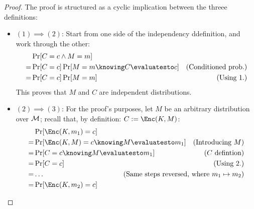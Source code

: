 \begin{proof}
    The proof is structured as a cyclic implication between the threee definitions:
    
    \begin{itemize}
        \item $(1) \implies (2)$: Start from one side of the independency ddefinition, and work through the other:
        \begin{align*}
            & \Pr[C = c \wedge M = m]                           & \\
            =& \Pr[C = c] \Pr[M = m \knowing C \evaluatesto c]  & \text{(Conditioned prob.)} \\
            =& \Pr[C = c] \Pr[M = m]                            & \text{(Using 1.)} \\
        \end{align*}
        This proves that $M$ and $C$ are independent distributions.
        
        \item $(2) \implies (3)$: For the proof's purposes, let $M$ be an arbitrary distribution over $\mathcal{M}$; recall that, by definition: $C := \Enc(K, M)$:
        \begin{align*}
            & \Pr[\Enc(K, m_1) = c]                             & \\
            =& \Pr[\Enc(K, M) = c \knowing M \evaluatesto m_1]  & \text{(Introducing $M$)} \\
            =& \Pr[C = c \knowing M \evaluatesto m_1]           & \text{($C$ defintion)} \\
            =& \Pr[C = c]                                       & \text{(Using 2.)} \\
            =& \dots                                            & \mathllap{\text{(Same steps reversed, where $m_1 \mapsto m_2$)}} \\
            =& \Pr[\Enc(K, m_2) = c]                            & \\
        \end{align*}



\end{itemize}
\end{proof}
